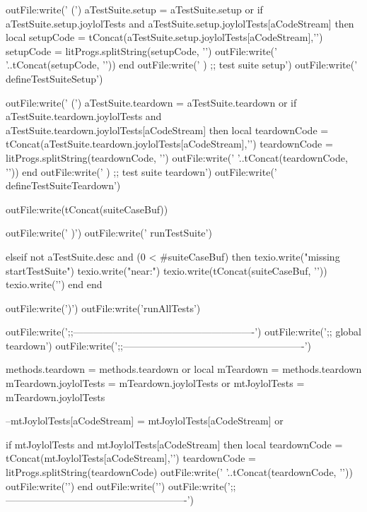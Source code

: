       outFile:write('    (\n')
      aTestSuite.setup = aTestSuite.setup or { }
      if aTestSuite.setup.joylolTests and
        aTestSuite.setup.joylolTests[aCodeStream] then
        local setupCode = tConcat(aTestSuite.setup.joylolTests[aCodeStream],'\n  ')
        setupCode = litProgs.splitString(setupCode, '\n')
        outFile:write('    '..tConcat(setupCode, '\n    '))
      end
      outFile:write('    ) ;; test suite setup\n')
      outFile:write('    defineTestSuiteSetup\n\n')

      outFile:write('    (\n')
      aTestSuite.teardown = aTestSuite.teardown or { }
      if aTestSuite.teardown.joylolTests and
        aTestSuite.teardown.joylolTests[aCodeStream] then
        local teardownCode = tConcat(aTestSuite.teardown.joylolTests[aCodeStream],'\n  ')
        teardownCode = litProgs.splitString(teardownCode, '\n')
        outFile:write('    '..tConcat(teardownCode, '\n    '))
      end
      outFile:write('    ) ;; test suite teardown\n')
      outFile:write('    defineTestSuiteTeardown\n\n')

      outFile:write(tConcat(suiteCaseBuf))

      outFile:write('  )\n')
      outFile:write('  runTestSuite\n\n')
      
    elseif not aTestSuite.desc and (0 < #suiteCaseBuf) then
      texio.write("\nERROR missing \\startTestSuite\n")
      texio.write("near:\n")
      texio.write(tConcat(suiteCaseBuf, '\n'))
      texio.write('\n')
    end
  end
  
  outFile:write(')\n')
  outFile:write('runAllTests\n\n')

  outFile:write(';;-------------------------------------------------------\n')
  outFile:write(';; global teardown\n')
  outFile:write(';;-------------------------------------------------------\n\n')
  
  methods.teardown      = methods.teardown or { }
  local mTeardown       = methods.teardown
  mTeardown.joylolTests = mTeardown.joylolTests or { }
  mtJoylolTests         = mTeardown.joylolTests

  --mtJoylolTests[aCodeStream] = mtJoylolTests[aCodeStream] or { }

  if mtJoylolTests and
    mtJoylolTests[aCodeStream] then
    local teardownCode = tConcat(mtJoylolTests[aCodeStream],'\n')
    teardownCode       = litProgs.splitString(teardownCode)
    outFile:write('  '..tConcat(teardownCode, '\n  '))
    outFile:write('\n')
  end
  outFile:write('\n')
  outFile:write(';;-------------------------------------------------------\n')

